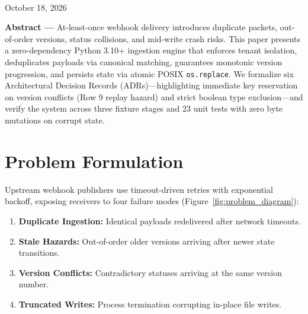 \documentclass[10pt,a4paper]{article}
\begin{document}
\vspace*{-1.5em}
\noindent{\color{gblue}\rule{\textwidth}{1.5pt}}
\vspace{0.2em}


\vspace{0.5em}
 \\
{\footnotesize\color{gslate} October 18, 2026 }
\vspace{0.4em}

\begin{tcolorbox}[colback=gbg, colframe=gborder, boxrule=0.5pt, arc=2pt, left=10pt, right=10pt, top=6pt, bottom=6pt]
\footnotesize\noindent\textbf{\color{gdark}Abstract ---}
At-least-once webhook delivery introduces duplicate packets, out-of-order versions, status collisions, and mid-write crash risks. This paper presents a zero-dependency Python 3.10+ ingestion engine that enforces tenant isolation, deduplicates payloads via canonical matching, guarantees monotonic version progression, and persists state via atomic POSIX \texttt{os.replace}. We formalize six Architectural Decision Records (ADRs)—highlighting immediate key reservation on version conflicts (Row 9 replay hazard) and strict boolean type exclusion—and verify the system across three fixture stages and 23 unit tests with zero byte mutations on corrupt state.
\end{tcolorbox}
\vspace{0.3em}

\section{Problem Formulation}

Upstream webhook publishers use timeout-driven retries with exponential backoff, exposing receivers to four failure modes (Figure~\ref{fig:problem_diagram}):
\begin{enumerate}[leftmargin=1.5em, noitemsep, topsep=2pt]
    \item \textbf{Duplicate Ingestion:} Identical payloads redelivered after network timeouts.
    \item \textbf{Stale Hazards:} Out-of-order older versions arriving after newer state transitions.
    \item \textbf{Version Conflicts:} Contradictory statuses arriving at the same version number.
    \item \textbf{Truncated Writes:} Process termination corrupting in-place file writes.
\end{enumerate}
\end{document}
